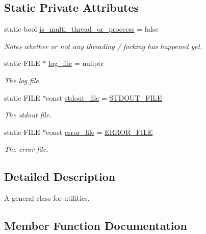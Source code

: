 \subsection*{Static Private Attributes}
\begin{DoxyCompactItemize}
\item 
static bool \hyperlink{class_utilities_af893d8dcd5bb1ba3fc72fc108536bcbc}{is\+\_\+multi\+\_\+thread\+\_\+or\+\_\+proccess} = false
\begin{DoxyCompactList}\small\item\em Notes whether or not any threading / forking has happened yet. \end{DoxyCompactList}\item 
static F\+I\+LE $\ast$ \hyperlink{class_utilities_a63ce9d08b6459cd102bb368a274aca07}{log\+\_\+file} = nullptr
\begin{DoxyCompactList}\small\item\em The log file. \end{DoxyCompactList}\item 
static F\+I\+LE $\ast$const \hyperlink{class_utilities_a224eea0a234ac9877a8334f74fc89ef0}{stdout\+\_\+file} = \hyperlink{constants_8hpp_a195ca3987a60992c5abfc663cd37151d}{S\+T\+D\+O\+U\+T\+\_\+\+F\+I\+LE}
\begin{DoxyCompactList}\small\item\em The stdout file. \end{DoxyCompactList}\item 
static F\+I\+LE $\ast$const \hyperlink{class_utilities_afc3b1cf892b76cede8fa87bfdd17533c}{error\+\_\+file} = \hyperlink{constants_8hpp_a9fdff3d78b754d4b831816d0560dbb57}{E\+R\+R\+O\+R\+\_\+\+F\+I\+LE}
\begin{DoxyCompactList}\small\item\em The error file. \end{DoxyCompactList}\end{DoxyCompactItemize}


\subsection{Detailed Description}
A general class for utilities. 

\subsection{Member Function Documentation}

